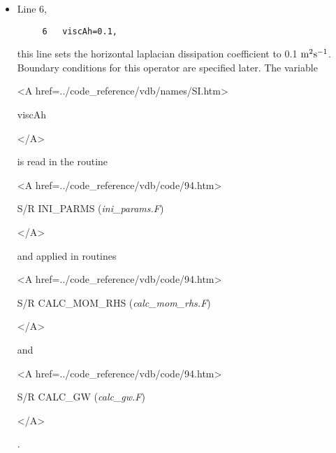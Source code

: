 \begin{itemize}
\item Line 6,
\begin{verbatim}
     6   viscAh=0.1,
\end{verbatim}
this line sets the horizontal laplacian dissipation coefficient to
0.1 ${\rm m^{2}s^{-1}}$. Boundary conditions
for this operator are specified later. 
The variable 
{\bf 
\begin{rawhtml} <A href=../code_reference/vdb/names/SI.htm> \end{rawhtml}
viscAh
\begin{rawhtml} </A>\end{rawhtml}
}
is read in the routine
{\it
\begin{rawhtml} <A href=../code_reference/vdb/code/94.htm> \end{rawhtml}
S/R INI\_PARMS ({\it ini\_params.F})
\begin{rawhtml} </A>\end{rawhtml}
} and applied in routines 
{\it 
\begin{rawhtml} <A href=../code_reference/vdb/code/94.htm> \end{rawhtml}
S/R CALC\_MOM\_RHS ({\it calc\_mom\_rhs.F})
\begin{rawhtml} </A>\end{rawhtml}
} and 
{\it 
\begin{rawhtml} <A href=../code_reference/vdb/code/94.htm> \end{rawhtml}
S/R CALC\_GW ({\it calc\_gw.F})
\begin{rawhtml} </A>\end{rawhtml}
}.



\end{itemize}
